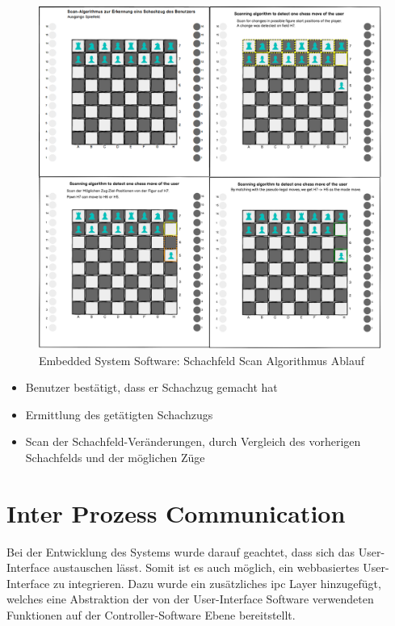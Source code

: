 \begin{figure}
\centering
\includegraphics{images/ATC_ChessMoveAlgorithm.png}
\caption{Embedded System Software: Schachfeld Scan Algorithmus Ablauf
\label{ATC_ChessMoveAlgorithm}}
\end{figure}

\begin{itemize}
\tightlist
\item
  Benutzer bestätigt, dass er Schachzug gemacht hat
\item
  Ermittlung des getätigten Schachzugs
\item
  Scan der Schachfeld-Veränderungen, durch Vergleich des vorherigen
  Schachfelds und der möglichen Züge
\end{itemize}

\hypertarget{inter-prozess-communication}{%
\section{Inter Prozess
Communication}\label{inter-prozess-communication}}

Bei der Entwicklung des Systems wurde darauf geachtet, dass sich das
User-Interface austauschen lässt. Somit ist es auch möglich, ein
webbasiertes User-Interface zu integrieren. Dazu wurde ein zusätzliches
\gls{ipc} Layer hinzugefügt, welches eine Abstraktion der von der
User-Interface Software verwendeten Funktionen auf der
Controller-Software Ebene bereitstellt.

